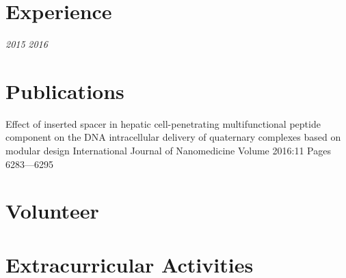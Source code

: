 

\section{Experience}

{
	\textit{2015}
	\textit{2016}
}

\section{Publications}


\publicationgroup
{Effect of inserted spacer in hepatic cell-penetrating multifunctional peptide component on the DNA intracellular delivery of quaternary complexes based on modular design}
{ International Journal of Nanomedicine Volume 2016:11 Pages 6283—6295  }




\section{Volunteer}

\section{Extracurricular Activities}

